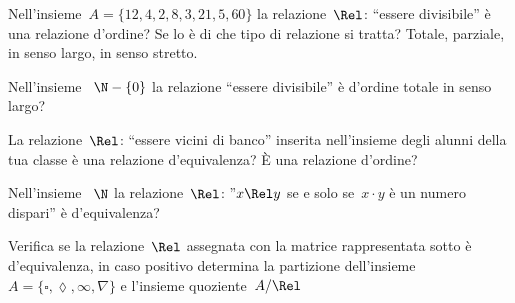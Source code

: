 \begin{esercizio}
\label{ese:B.49}
Nell'insieme~\(A = \{ 12, 4, 2, 8, 3, 21, 5, 60 \}\) la relazione~\(\Rel\): 
``essere divisibile'' è una relazione d'ordine? Se lo è di che tipo di 
relazione si tratta? Totale, parziale, in senso largo, in senso stretto.
\end{esercizio}

\begin{esercizio}
\label{ese:B.50}
Nell'insieme ~\(\N - \{ 0 \}\) la relazione ``essere divisibile'' è d'ordine 
totale in senso largo?
\end{esercizio}

\begin{esercizio}
\label{ese:B.53}
La relazione~\(\Rel\): ``essere vicini di banco'' inserita nell'insieme degli 
alunni della tua classe è una relazione d'equivalenza? 
È una relazione d'ordine?
\end{esercizio}

\begin{esercizio}
\label{ese:B.55}
Nell'insieme ~\(\N\) la relazione~\(\Rel\): 
''\(x \Rel y\) se e solo se~\(x \cdot y\) è un numero dispari'' è 
d'equivalenza?
\end{esercizio}

\begin{esercizio}
\label{ese:B.57}
Verifica se la relazione~\(\Rel\) assegnata con la matrice rappresentata
sotto è d'equivalenza, in caso positivo determina la partizione 
dell'insieme~\(A =\{\square, \lozenge, \infty, \nabla\}\) e l'insieme
quoziente~\(A/\Rel\)
\end{esercizio}

